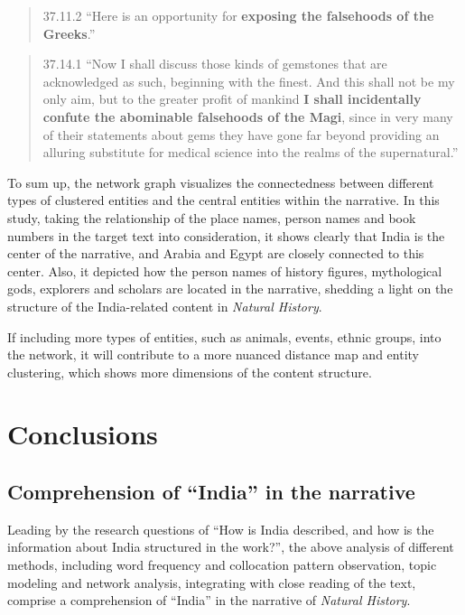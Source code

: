 \documentclass[
  12pt,
]{article}
\begin{document}
\begin{quote}
37.11.2 ``Here is an opportunity for \textbf{exposing the falsehoods of
the Greeks}.''
\end{quote}

\begin{quote}
37.14.1 ``Now I shall discuss those kinds of gemstones that are
acknowledged as such, beginning with the finest. And this shall not be
my only aim, but to the greater profit of mankind \textbf{I shall
incidentally confute the abominable falsehoods of the Magi}, since in
very many of their statements about gems they have gone far beyond
providing an alluring substitute for medical science into the realms of
the supernatural.''
\end{quote}

To sum up, the network graph visualizes the connectedness between
different types of clustered entities and the central entities within
the narrative. In this study, taking the relationship of the place
names, person names and book numbers in the target text into
consideration, it shows clearly that India is the center of the
narrative, and Arabia and Egypt are closely connected to this center.
Also, it depicted how the person names of history figures, mythological
gods, explorers and scholars are located in the narrative, shedding a
light on the structure of the India-related content in \emph{Natural
History}.

If including more types of entities, such as animals, events, ethnic
groups, into the network, it will contribute to a more nuanced distance
map and entity clustering, which shows more dimensions of the content
structure.

\hypertarget{sec-conclusions}{%
\section{Conclusions}\label{sec-conclusions}}

\hypertarget{comprehension-of-india-in-the-narrative}{%
\subsection{Comprehension of ``India'' in the
narrative}\label{comprehension-of-india-in-the-narrative}}

Leading by the research questions of ``How is India described, and how
is the information about India structured in the work?'', the above
analysis of different methods, including word frequency and collocation
pattern observation, topic modeling and network analysis, integrating
with close reading of the text, comprise a comprehension of ``India'' in
the narrative of \emph{Natural History}.
\end{document}
